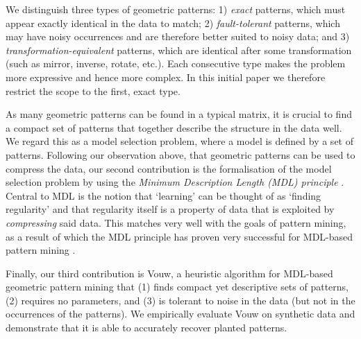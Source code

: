 \documentclass{llncs}
\begin{document}
We distinguish three types of geometric patterns: 1) \emph{exact} patterns, which must appear exactly identical in the data to match; 2) \emph{fault-tolerant} patterns, which may have noisy occurrences and are therefore better suited to noisy data; and 3) \emph{transformation-equivalent} patterns, which are identical after some transformation (such as mirror, inverse, rotate, etc.). Each consecutive type makes the problem more expressive and hence more complex. In this initial paper we therefore restrict the scope to the first, exact type.

As many geometric patterns can be found in a typical matrix, it is crucial to find a compact set of patterns that together describe the structure in the data well. We regard this as a model selection problem, where a model is defined by a set of patterns. Following our observation above, that geometric patterns can be used to compress the data, our second contribution is the formalisation of the model selection problem by using the \emph{Minimum Description Length (MDL) principle} \cite{rissanenmdl,grunwaldmdl}. Central to MDL is the notion that `learning' can be thought of as `finding regularity' and that regularity itself is a property of data that is exploited by \emph{compressing} said data. This matches very well with the goals of pattern mining, as a result of which the MDL principle has proven very successful for MDL-based pattern mining \cite{krimp,classy}.

Finally, our third contribution is Vouw, a heuristic algorithm for MDL-based geometric pattern mining that (1) finds compact yet descriptive sets of patterns, (2) requires no parameters, and (3) is tolerant to noise in the data (but not in the occurrences of the patterns). We empirically evaluate Vouw on synthetic data and demonstrate that it is able to accurately recover planted patterns.
\end{document}
